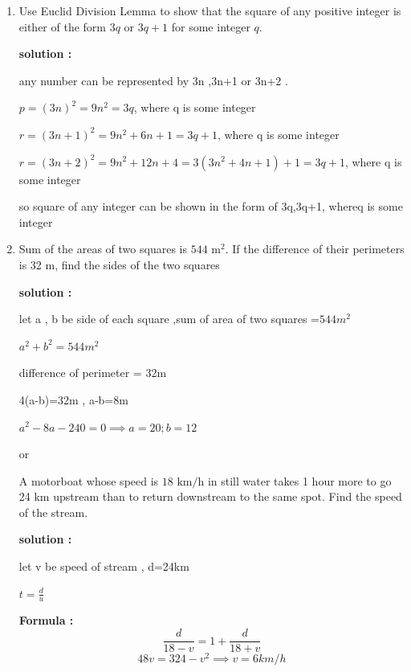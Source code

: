 \begin{enumerate}
\textbf{solution :}

equation of line = $3x-8y=50$, this line cuts the y- axis at $(0,-\frac{25}{4})$

let $\lambda :1 $ be the ratio , using section formula 

$(0,-\frac{25}{4})=\left( \frac{-2\lambda + 6}{\lambda +1} ,\frac{-7\lambda -4}{\lambda +1}\right) $

$\lambda=3 $ , so ratio is 3:1 and intersection point is $(0,-\frac{25}{4})$

\item Use Euclid Division Lemma to show that the square of any positive integer is either of the form $3q$ or $3q+1$ for some integer $q$.

\textbf{solution  :}

any number can be represented by 3n ,3n+1 or 3n+2 .

$p=(3n)^2 = 9n^2 =3q $, where q is some integer 

$r= (3n +1)^2 = 9n^2+6n +1= 3q+1 $, where q is some integer 

$r=(3n+2)^2= 9n^2+ 12n+4= 3(3n^2+4n+1)+1= 3q+1$, where q is some integer 

so square of any integer can be shown in the form of 3q,3q+1, whereq is some integer 

\item  Sum of the areas of two squares is $544\text{ m}^{2}$. If the difference of their perimeters is 32 m, find the sides of the two squares

\textbf{solution :}

let a , b be side of each square ,sum of area of two squares =$544m^2$

$a^2+b^2 = 544m^2$

difference of perimeter = 32m

4(a-b)=32m , a-b=8m 

$a^2-8a-240 =0 \implies a=20 ;b=12 $

\begin{center}
    or 
\end{center}

A motorboat whose speed is $18\text{ km/h}$ in still water takes 1 hour more to go 24 km upstream than to return downstream to the same spot. Find the speed of the stream. 

\textbf{solution :}

let v be speed of stream , d=24km 

$t= \frac{d}{u}$

\textbf{Formula :}
\begin{equation}
    \frac{d}{18-v}= 1+ \frac{d}{18+v}\tag{35.1}
\end{equation}
$$48v=324-v^2\implies v=6km/h$$


\end{enumerate}
